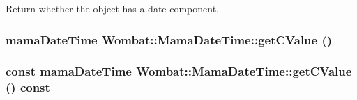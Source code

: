 Return whether the object has a date component. \hypertarget{classWombat_1_1MamaDateTime_aa332e6644fd1bcee35d417188c50aeb3}{
\subsubsection[{getCValue}]{\setlength{\rightskip}{0pt plus 5cm}mamaDateTime Wombat::MamaDateTime::getCValue ()}}
\label{classWombat_1_1MamaDateTime_aa332e6644fd1bcee35d417188c50aeb3}
\hypertarget{classWombat_1_1MamaDateTime_a59cb3db21937c616d42359380914fa4a}{
\subsubsection[{getCValue}]{\setlength{\rightskip}{0pt plus 5cm}const mamaDateTime Wombat::MamaDateTime::getCValue () const}}
\label{classWombat_1_1MamaDateTime_a59cb3db21937c616d42359380914fa4a}
